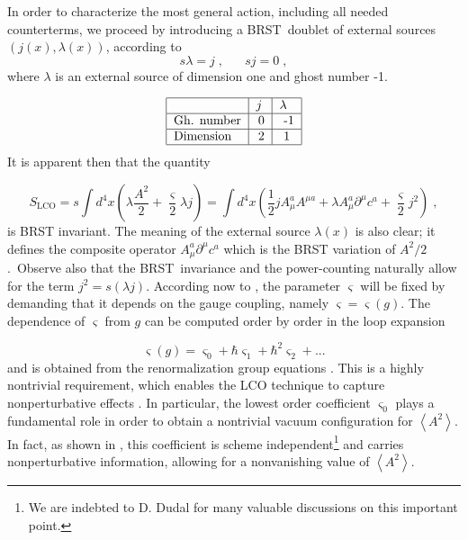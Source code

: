 \documentclass[a4paper,12pt]{article}
\begin{document}
In order to characterize the most general action, including all needed
counterterms, we proceed by introducing a BRST\ doublet \cite{book,bbh} of
external sources $\left( j(x),\lambda (x)\right) $, according to 
\begin{equation}
s\lambda =j\;,\;\;\;\;\;\;sj=0\;,  \label{jld}
\end{equation}
where $\lambda $ is an external source of dimension one and ghost number -1.

\[
\begin{tabular}{|l|l|l|}
\hline
& $j$ & $\lambda $ \\ \hline
Gh. number & \thinspace 0 & \thinspace \thinspace -1 \\ \hline
Dimension & \thinspace 2 & $\,\,$1 \\ \hline
\end{tabular}
\]
It is apparent then that the quantity

\begin{equation}
S_{\mathrm{LCO}}=s\int d^{4}x\left( \lambda \frac{A^{2}}{2}+\frac{\varsigma 
}{2}\lambda j\right) =\int d^{4}x\left( \frac{1}{2}jA_{\mu }^{a}A^{\mu
a}+\lambda A_{\mu }^{a}\partial ^{\mu }c^{a}+\frac{\varsigma }{2}%
j^{2}\right) \;,  \label{lj}
\end{equation}
is BRST invariant. The meaning of the external source $\lambda (x)$ is also
clear; it defines the composite operator $A_{\mu }^{a}\partial ^{\mu }c^{a}$
which is the BRST variation of $A^{2}/2$.\ Observe also that the BRST\
invariance and the power-counting naturally allow for the term $%
j^{2}=s(\lambda j)$. According now to \cite{v1,v2,v3}, the parameter $%
\varsigma $ will be fixed by demanding that it depends on the gauge
coupling, namely $\varsigma =\varsigma (g)$. The dependence of $\varsigma $
from $g$ can be computed order by order in the loop expansion

\begin{equation}
\varsigma (g)=\varsigma _{0}+\hbar \varsigma _{1}+\hbar ^{2}\varsigma
_{2}+...  \label{ls}
\end{equation}
and is obtained from the renormalization group equations \cite{v1,v2,v3}.
This is a highly nontrivial requirement, which enables the LCO technique to
capture nonperturbative effects \cite{v1,v2,v3}. In particular, the lowest
order coefficient $\varsigma _{0}$ plays a fundamental role in order to
obtain a nontrivial vacuum configuration for $\left\langle
A^{2}\right\rangle $. In fact, as shown in \cite{v1}, this coefficient is
scheme independent\footnote{%
We are indebted to D. Dudal for many valuable discussions on this important
point.} and carries nonperturbative information, allowing for a nonvanishing
value of $\left\langle A^{2}\right\rangle $.
\end{document}
